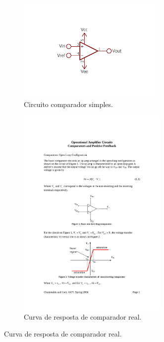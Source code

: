	\begin{figure}[htb]
		\caption{\label{fig_double_comparator}Comparador e curva de resposta.}
		\begin{subfigure}{.5\textwidth}
			\caption{\label{fig_comparator_circuit}Circuito comparador simples.}
			\centering
			\includegraphics[width=0.77\textwidth, trim={7.5cm 5cm 7.5cm 5.5cm},clip]{circuits/comparator_amp.pdf}
		\end{subfigure}
		\begin{subfigure}{.5\textwidth}
			\caption{\label{fig_comparator_transfer}Curva de resposta de comparador real.}
			\centering
			\includegraphics[page=1,width=0.8\textwidth, trim={6.9cm 5.5cm 6.9cm 19.25cm},clip]{circuits/lecture_comparator.pdf}
		\end{subfigure}
	\end{figure}

